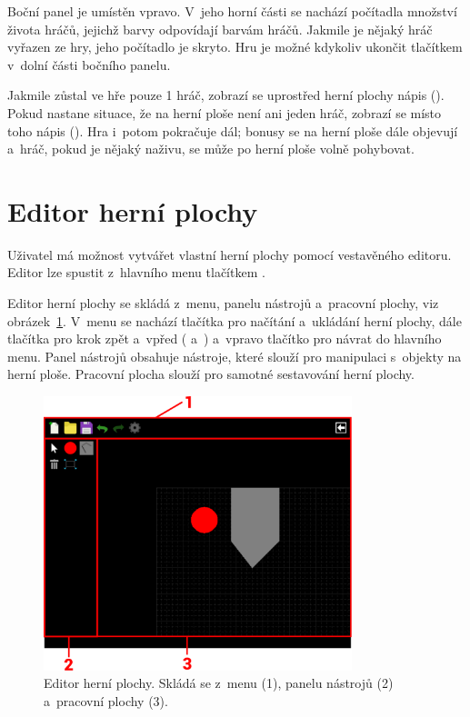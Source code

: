 Boční panel je umístěn vpravo. V~jeho horní části se nachází počítadla množství života hráčů, jejichž barvy odpovídají barvám hráčů. Jakmile je nějaký hráč vyřazen ze hry, jeho počítadlo je skryto. Hru je možné kdykoliv ukončit tlačítkem  v~dolní části bočního panelu.

Jakmile zůstal ve hře pouze 1 hráč, zobrazí se uprostřed herní plochy nápis  (). Pokud nastane situace, že na herní ploše není ani jeden hráč, zobrazí se místo toho nápis  (). Hra i~potom pokračuje dál; bonusy se na herní ploše dále objevují a~hráč, pokud je nějaký naživu, se může po herní ploše volně pohybovat.

\section{Editor herní plochy}
\label{sec:editor-herni-plochy}

Uživatel má možnost vytvářet vlastní herní plochy pomocí vestavěného editoru. Editor lze spustit z~hlavního menu tlačítkem .

Editor herní plochy se skládá z~menu, panelu nástrojů a~pracovní plochy, viz obrázek~\ref{fig:stage-editor}. V~menu se nachází tlačítka pro načítání a~ukládání herní plochy, dále tlačítka pro krok zpět a~vpřed ( a~) a~vpravo tlačítko pro návrat do hlavního menu. Panel nástrojů obsahuje nástroje, které slouží pro manipulaci s~objekty na herní ploše. Pracovní plocha slouží pro samotné sestavování herní plochy.

\begin{figure}[ht]
    \centering
    \includegraphics[width=0.8\textwidth]{doc/obrazky-figures/stage-editor.pdf}
    \caption{Editor herní plochy. Skládá se z~menu (1), panelu nástrojů (2) a~pracovní plochy (3).}
    \label{fig:stage-editor}
\end{figure}

